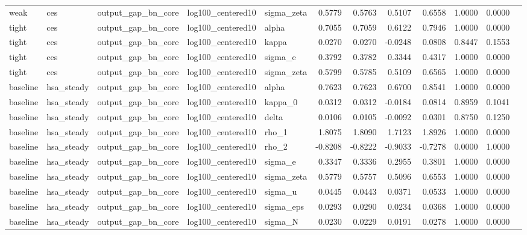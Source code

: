 \begin{tabular}{lllllrrrrrrl}
weak & ces & output\_gap\_bn\_core & log100\_centered10 & sigma\_zeta & 0.5779 & 0.5763 & 0.5107 & 0.6558 & 1.0000 & 0.0000 &  \\
tight & ces & output\_gap\_bn\_core & log100\_centered10 & alpha & 0.7055 & 0.7059 & 0.6122 & 0.7946 & 1.0000 & 0.0000 &  \\
tight & ces & output\_gap\_bn\_core & log100\_centered10 & kappa & 0.0270 & 0.0270 & -0.0248 & 0.0808 & 0.8447 & 0.1553 &  \\
tight & ces & output\_gap\_bn\_core & log100\_centered10 & sigma\_e & 0.3792 & 0.3782 & 0.3344 & 0.4317 & 1.0000 & 0.0000 &  \\
tight & ces & output\_gap\_bn\_core & log100\_centered10 & sigma\_zeta & 0.5799 & 0.5785 & 0.5109 & 0.6565 & 1.0000 & 0.0000 &  \\
baseline & hsa\_steady & output\_gap\_bn\_core & log100\_centered10 & alpha & 0.7623 & 0.7623 & 0.6700 & 0.8541 & 1.0000 & 0.0000 &  \\
baseline & hsa\_steady & output\_gap\_bn\_core & log100\_centered10 & kappa\_0 & 0.0312 & 0.0312 & -0.0184 & 0.0814 & 0.8959 & 0.1041 &  \\
baseline & hsa\_steady & output\_gap\_bn\_core & log100\_centered10 & delta & 0.0106 & 0.0105 & -0.0092 & 0.0301 & 0.8750 & 0.1250 &  \\
baseline & hsa\_steady & output\_gap\_bn\_core & log100\_centered10 & rho\_1 & 1.8075 & 1.8090 & 1.7123 & 1.8926 & 1.0000 & 0.0000 &  \\
baseline & hsa\_steady & output\_gap\_bn\_core & log100\_centered10 & rho\_2 & -0.8208 & -0.8222 & -0.9033 & -0.7278 & 0.0000 & 1.0000 &  \\
baseline & hsa\_steady & output\_gap\_bn\_core & log100\_centered10 & sigma\_e & 0.3347 & 0.3336 & 0.2955 & 0.3801 & 1.0000 & 0.0000 &  \\
baseline & hsa\_steady & output\_gap\_bn\_core & log100\_centered10 & sigma\_zeta & 0.5779 & 0.5757 & 0.5096 & 0.6553 & 1.0000 & 0.0000 &  \\
baseline & hsa\_steady & output\_gap\_bn\_core & log100\_centered10 & sigma\_u & 0.0445 & 0.0443 & 0.0371 & 0.0533 & 1.0000 & 0.0000 &  \\
baseline & hsa\_steady & output\_gap\_bn\_core & log100\_centered10 & sigma\_eps & 0.0293 & 0.0290 & 0.0234 & 0.0368 & 1.0000 & 0.0000 &  \\
baseline & hsa\_steady & output\_gap\_bn\_core & log100\_centered10 & sigma\_N & 0.0230 & 0.0229 & 0.0191 & 0.0278 & 1.0000 & 0.0000 &  \\

\end{tabular}
